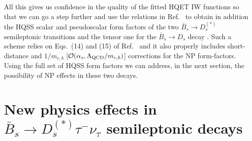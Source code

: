 \documentclass[aps,superscriptaddress,showpacs,nofootinbib,11pt]{revtex4-1}
\begin{document}
All this gives us confidence in the quality of the fitted HQET IW functions so that we can go a step further and use the relations in Ref.~\cite{Bernlochner:2017jka} to obtain in addition the HQSS scalar and pseudoscalar  form factors of the two $\bar B_s\to D_s^{(*)}$ semileptonic transitions and the tensor one for the $\bar B_s\to D_s$ decay . Such a scheme relies on Eqs.~(14) and (15) of Ref.~\cite{Bernlochner:2017jka}  and it also properly includes short-distance and $1/m_{c,b}$ [${\cal O}(\alpha_s,\Lambda_{\rm QCD}/m_{c,b})$] corrections for the NP form-factors.
Using the full set of HQSS form factors we can address, in the next section, the possibility of NP effects in these two decays.



\section{New physics effects in $\bar B_s\to D_s^{(*)}\tau^-\nu_\tau$ semileptonic decays}
\label{sec:NP}
\end{document}
